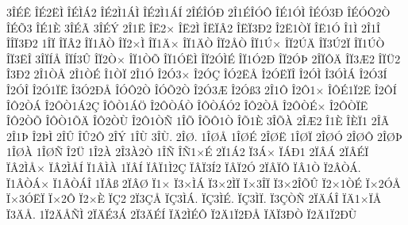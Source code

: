 {3^^ce^^c9^^ca
^^ce^^c92^^cb^^cc
^^ce^^c9^^cc^^c12
^^ce^^c92^^cc1^^c1^^cc
^^ce^^c92^^cc1^^c1^^cd
2^^ce^^c9^^ce^^d3^^d0
2^^ce1^^c9^^ce^^d3^^d4
^^ce^^c91^^d3^^cc
^^ce^^c9^^d33^^d0
^^ce^^c9^^d3^^d42^^d2
^^ce^^c9^^d53
^^ce^^c91^^c8
3^^ce^^c9^^c3
3^^ce^^c9^^dd
2^^ce1^^cb
^^ce^^cb2^^d7
^^ce^^cb2^^cc
^^ce^^cb^^cf^^c22
^^ce^^cb^^cf3^^d02
^^ce2^^cb1^^d2^^cf
^^ce^^cb1^^d3
^^ce1^^cc
2^^ce1^^ce
^^ce^^ce^^cf3^^d02
1^^ce^^cf
^^ce^^cf^^c22
^^ce^^cf1^^c2^^d2
^^ce^^cf2^^d7^^cc
^^ce^^cf1^^c4^^d7
^^ce^^cf1^^c4^^d2
^^ce^^cf2^^c5^^d2
^^ce^^cf1^^da^^d7
^^ce^^cf2^^da^^c4
^^ce^^cf3^^da2^^cf
^^ce^^cf1^^da^^d2
^^ce^^cf3^^cb^^ce
3^^ce^^cf^^cd^^c5
^^ce^^cf^^cd3^^db
^^ce^^cf2^^d2^^d7
^^ce^^cf1^^d2^^d5
^^ce^^cf1^^d3^^cb^^cc
^^ce^^cf2^^d3^^cc^^c9
^^ce^^cf1^^d32^^d0
^^ce^^cf2^^d3^^de
2^^ce^^cf^^d4^^c4
^^ce^^cf3^^c62
^^ce^^cf^^dc2
^^ce3^^d02
2^^ce1^^d2^^c5
2^^ce1^^d2^^c9
^^ce1^^d2^^cf
2^^ce1^^d3
^^ce2^^d33^^d7
^^ce2^^d3^^c7
^^ce^^d32^^cb^^c5
^^ce2^^d3^^cb^^cf^^ce
^^ce2^^d3^^cc
^^ce3^^d3^^cc^^c1
^^ce2^^d33^^cd
^^ce2^^d3^^ce
^^ce2^^d31^^cf^^cb
^^ce3^^d32^^d0^^c5
^^ce^^d3^^d42^^d2
^^ce^^d3^^d52^^d2
^^ce2^^d33^^c6
^^ce2^^d3^^df3
2^^ce1^^d4
^^ce2^^d41^^d7
^^ce^^d4^^c91^^cf2^^cb
^^ce2^^d4^^cd
^^ce^^d42^^d2^^c1
^^ce2^^d4^^d21^^c12^^c7
^^ce^^d4^^d21^^c1^^d6
^^ce2^^d4^^d2^^c1^^d2
^^ce^^d4^^d2^^c1^^d32
^^ce^^d42^^d2^^c5
^^ce2^^d4^^d2^^c9^^d7
^^ce2^^d4^^d2^^cf^^cb
^^ce^^d42^^d2^^d5
^^ce^^d4^^d21^^d5^^c4
^^ce^^d42^^d2^^d9
^^ce2^^d41^^d2^^d1
1^^ce^^d5
^^ce^^d5^^d41^^d2
^^ce^^d51^^c8
3^^ce^^d5^^c0
2^^ce^^c62
^^ce1^^c8
^^ce^^c8^^cf1
2^^ce^^c3
2^^ce1^^de
^^ce2^^de^^cc
2^^ce^^db
^^ce^^db2^^d4
2^^ce^^dd
1^^ce^^d9
3^^ce^^d9.
2^^ce^^d8.
1^^ce^^d8^^c5
1^^ce^^d8^^c9
2^^ce^^d8^^cb
1^^ce^^d8^^cf
2^^ce^^d8^^d3
2^^ce^^d8^^d4
2^^ce^^d8^^de
1^^ce^^d8^^c0
1^^ce^^d8^^d1
^^ce2^^dc
1^^ce2^^c0
2^^ce3^^c02^^d2
1^^ce^^d1
^^ce^^d11^^d7^^c9
2^^cf1^^c12
^^cf3^^c1^^d7
^^cf^^c1^^d01
2^^cf^^c2^^c1
2^^cf^^c2^^c9^^cf
^^cf^^c22^^cc^^c5^^d7
^^cf^^c22^^cc^^c5^^cd
^^cf1^^c2^^cc^^c0
1^^cf^^c2^^cd
^^cf^^c2^^cf1^^cc2^^c7
^^cf^^c2^^cf3^^cd2
^^cf^^c2^^cf2^^d3
2^^cf^^c2^^cf^^d4
^^cf^^c21^^d2
^^cf2^^c2^^d2^^c1.
^^cf1^^c2^^d2^^c1^^d7
^^cf1^^c2^^d2^^c1^^ce
1^^cf^^c2^^df
2^^cf^^c2^^d8
^^cf1^^d7
^^cf3^^d7^^cc^^c1
^^cf3^^d72^^cc^^cf
^^cf^^d73^^ce^^cf
^^cf3^^d72^^ce^^d5^^db
^^cf2^^d71^^d2^^c9
^^cf^^d72^^d3^^c5
^^cf^^d73^^d3^^cb^^cf
^^cf^^d72^^d4
^^cf2^^d7^^c8
^^cf^^c72
2^^cf3^^c7^^c5
^^cf^^c73^^cc^^c1.
^^cf^^c73^^cc^^c9.
^^cf^^c73^^cc^^cf.
^^cf3^^c7^^d2^^d1
2^^cf^^c4^^c1^^ce
^^cf^^c41^^d7^^cf^^c5
^^cf3^^c4^^c5.
1^^cf2^^c4^^c5^^d1^^cc
2^^cf^^c4^^c93^^c1
2^^cf3^^c4^^c9^^cd
^^cf^^c42^^cc^^c9^^d4
^^cf2^^c41^^cf2^^d0^^c5
^^cf^^c4^^cf3^^d0^^d2
^^cf2^^c41^^cf2^^d0^^d9
}

